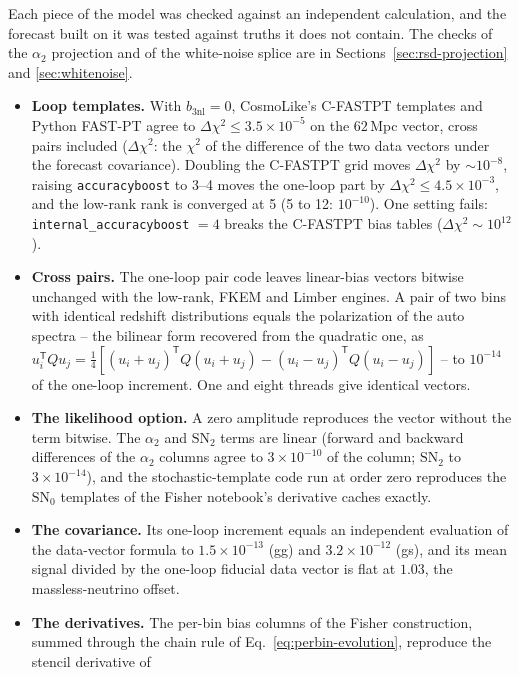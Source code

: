 \documentclass[11pt]{article}
\newcommand{\bthree}{b_{3\mathrm{nl}}} %
\newcommand{\SNz}{\mathrm{SN}_0}
\newcommand{\SNt}{\mathrm{SN}_2}
\begin{document}
Each piece of the model was checked against an independent
calculation, and the forecast built on it was tested against truths it
does not contain.  The checks of the $\alpha_2$ projection and of the
white-noise splice are in Sections~\ref{sec:rsd-projection} and
\ref{sec:whitenoise}.
\begin{itemize}
\item \textbf{Loop templates.}  With $\bthree = 0$, CosmoLike's
C-FASTPT templates and Python FAST-PT agree to
$\Delta\chi^2 \le 3.5\times10^{-5}$ on the $62$\,Mpc vector, cross
pairs included ($\Delta\chi^2$: the $\chi^2$ of the difference of the
two data vectors under the forecast covariance).  Doubling the C-FASTPT grid moves $\Delta\chi^2$ by
$\sim10^{-8}$, raising \texttt{accuracyboost} to 3--4 moves the
one-loop part by $\Delta\chi^2 \le 4.5\times10^{-3}$, and the low-rank
rank is converged at 5 (5 to 12: $10^{-10}$).  One setting fails:
\texttt{internal\_accuracyboost} $= 4$ breaks the C-FASTPT bias tables
($\Delta\chi^2 \sim 10^{12}$).
\item \textbf{Cross pairs.}  The one-loop pair code leaves linear-bias
vectors bitwise unchanged with the low-rank, FKEM and Limber engines.  A pair of two bins with
identical redshift distributions equals the polarization of the auto
spectra -- the bilinear form recovered from the quadratic one, as
$u_i^{\mathsf T} Q u_j = \tfrac14\!\left[(u_i + u_j)^{\mathsf T} Q
(u_i + u_j) - (u_i - u_j)^{\mathsf T} Q (u_i - u_j)\right]$ -- to
$10^{-14}$ of the one-loop increment.  One and eight threads give
identical vectors.
\item \textbf{The likelihood option.}  A zero amplitude reproduces the
vector without the term bitwise.  The $\alpha_2$ and $\SNt$ terms are
linear (forward and backward differences of the $\alpha_2$ columns
agree to $3\times10^{-10}$ of the column; $\SNt$ to $3\times10^{-14}$),
and the stochastic-template code run at order zero reproduces the
$\SNz$ templates of the Fisher notebook's derivative caches exactly.
\item \textbf{The covariance.}  Its one-loop increment equals an
independent evaluation of the data-vector formula to $1.5\times10^{-13}$
(gg) and $3.2\times10^{-12}$ (gs), and its mean signal divided by the
one-loop fiducial data vector is flat at $1.03$, the massless-neutrino
offset.
\item \textbf{The derivatives.}  The per-bin bias columns of the Fisher
construction, summed through the chain rule of
Eq.~\eqref{eq:perbin-evolution}, reproduce the stencil derivative of

\end{itemize}
\end{document}
